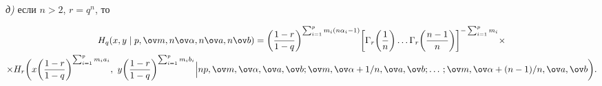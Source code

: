 \begin{thms}
 


{\em д)} если $n>2$, $r=q^n$, то 


\begin{multline*} 


H_q(x,y\mid p,\ov m,n\ov\alpha,n\ov a,n\ov b)= 


\bigg(\frac{1-r}{1-q} \bigg)^{\sum^p_{i=1}m_i(n\alpha_i-1)} 


\bigg[\Gamma_r\bigg(\frac{1}{n} \bigg)\dotsc \Gamma_r 


\bigg(\frac{n-1}{n} \bigg) 


\bigg]^{-\sum^p_{i=1}m_i}\times \\ 


% 


\times H_r\bigg(x\bigg(\frac{1-r}{1-q} 


\bigg)^{\sum^p_{i=1}m_i a_i},\ y\bigg(\frac{1-r}{1-q} 


\bigg)^{\sum^p_{i=1}m_i b_i}\Big| 


n p,\ov m,\ov\alpha,\ov a,\ov b;\ov m,\ov\alpha+1/n,\ov a,\ov b;\dotsc 


;\ov m,\ov\alpha+(n-1)/n,\ov a,\ov b\bigg). 


\end{multline*} 


\end{thms} 


 


